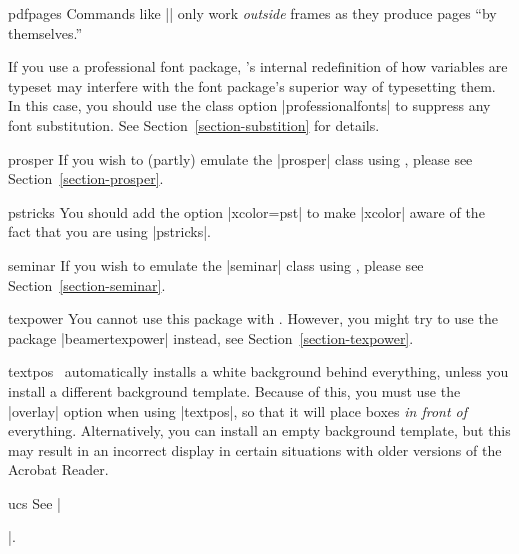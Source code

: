 \begin{package}{{pdfpages}}
  Commands like || only work \emph{outside} frames as they produce pages ``by themselves.''
\end{package}  
 
\begin{package}{{\normalfont{}}}
  \beamernote
  If you use a professional font package, \beamer's internal redefinition of how variables are typeset may interfere with the font package's superior way of typesetting them. In this case, you should use the class option |professionalfonts| to suppress any font substitution. See Section~\ref{section-substition} for details.
\end{package}

\begin{class}{{prosper}}
  If you wish to (partly) emulate the |prosper| class using \beamer, please see Section~\ref{section-prosper}.
\end{class}

\begin{package}{{pstricks}}
  You should add the option |xcolor=pst| to make |xcolor| aware of the fact that you are using |pstricks|.
\end{package}

\begin{class}{{seminar}}
  If you wish to emulate the |seminar| class using \beamer, please see Section~\ref{section-seminar}.
\end{class}

\begin{package}{{texpower}}
  You cannot use this package with \beamer. However, you might try to use the package |beamertexpower| instead, see Section~\ref{section-texpower}.
\end{package}

\begin{package}{{textpos}}
  \beamernote
  \beamer\ automatically installs a white background behind everything, unless you install a different background template. Because of this, you must use the |overlay| option when using |textpos|, so that it will place boxes \emph{in front of} everything. Alternatively, you can install an empty background template, but this may result in an incorrect display in certain situations with older versions of the Acrobat Reader.
\end{package}

\begin{package}{{ucs}}
  See |\usepackage[utf8,utf8x]{inputenc}|.
\end{package}

